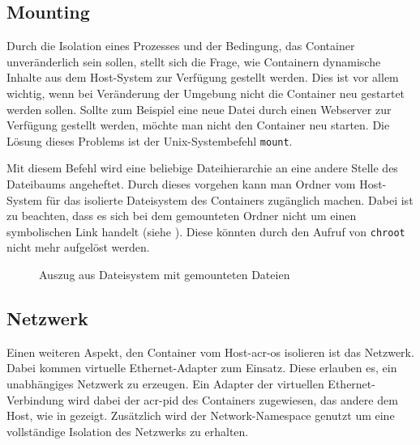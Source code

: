 \subsection{Mounting}
\label{sec:mount}
Durch die Isolation eines Prozesses und der Bedingung, das Container unveränderlich sein sollen, stellt sich die Frage, wie Containern dynamische Inhalte aus dem Host-System zur Verfügung gestellt werden. Dies ist vor allem wichtig, wenn bei Veränderung der Umgebung nicht die Container neu gestartet werden sollen. Sollte zum Beispiel eine neue Datei durch einen Webserver zur Verfügung gestellt werden, möchte man nicht den Container neu starten. Die Lösung dieses Problems ist der Unix-Systembefehl \texttt{mount}. 

Mit diesem Befehl wird eine beliebige Dateihierarchie an eine andere Stelle des Dateibaums angeheftet. Durch dieses vorgehen kann man Ordner vom Host-System  für das isolierte Dateisystem des Containers zugänglich machen. Dabei ist zu beachten, dass es sich bei dem gemounteten Ordner nicht um einen symbolischen Link handelt (siehe ). Diese könnten durch den Aufruf von \texttt{chroot} nicht mehr aufgelöst werden.

\begin{figure}[h]
	\centering
	\begin{minipage}{0.9\textwidth}
	\end{minipage}
	\caption{Auszug aus Dateisystem mit gemounteten Dateien}
	\label{fig:mountExample}
\end{figure}

\subsection{Netzwerk}
\label{sec:netzwerk}

Einen weiteren Aspekt, den Container vom Host-\gls{acr-os} isolieren ist das Netzwerk. Dabei kommen virtuelle Ethernet-Adapter zum Einsatz. Diese erlauben es, ein unabhängiges Netzwerk zu erzeugen. Ein Adapter der virtuellen Ethernet-Verbindung wird dabei der \gls{acr-pid} des Containers zugewiesen, das andere dem Host, wie in  gezeigt. Zusätzlich wird der Network-Namespace genutzt um eine vollständige Isolation des Netzwerks zu erhalten.

